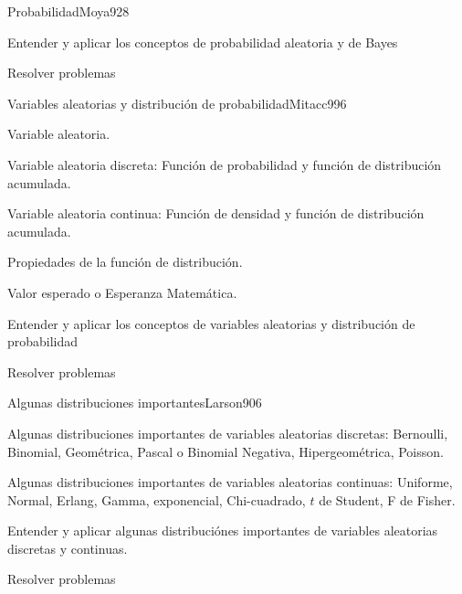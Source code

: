 \begin{syllabus}
\begin{unit}{Probabilidad}{Moya92}{8}
   \begin{unitgoals}
         \item  Entender y aplicar los conceptos de probabilidad aleatoria y de Bayes
         \item  Resolver problemas
   \end{unitgoals}
\end{unit}

\begin{unit}{Variables aleatorias y distribución de probabilidad}{Mitacc99}{6}
   \begin{topics}
         \item  Variable aleatoria.
	 \item  Variable aleatoria discreta: Función de probabilidad y función de distribución acumulada.
         \item  Variable aleatoria continua: Función de densidad y función de distribución acumulada.
	 \item  Propiedades de la función de distribución.
         \item  Valor esperado o Esperanza Matemática.
   \end{topics}

   \begin{unitgoals}
         \item  Entender y aplicar los conceptos de variables aleatorias y  distribución de probabilidad
         \item  Resolver problemas
   \end{unitgoals}
\end{unit}

\begin{unit}{Algunas distribuciones importantes}{Larson90}{6}
   \begin{topics}
         \item  Algunas distribuciones importantes de variables aleatorias discretas: Bernoulli, Binomial,  Geométrica, Pascal o Binomial Negativa, Hipergeométrica, Poisson.
	 \item  Algunas distribuciones importantes de variables aleatorias continuas: Uniforme, Normal, Erlang, Gamma, exponencial, Chi-cuadrado, $t$ de Student, F de Fisher.
   \end{topics}

   \begin{unitgoals}
         \item  Entender y aplicar algunas distribuciónes importantes de variables aleatorias discretas y continuas.
         \item  Resolver problemas
   \end{unitgoals}
\end{unit}


\end{syllabus}
